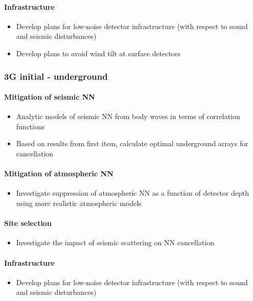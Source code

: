 \paragraph{Infrastructure}
\begin{itemize}
\item Develop plans for low-noise detector infrastructure (with respect to sound and seismic disturbances)
\item Develop plans to avoid wind tilt at surface detectors
\end{itemize}

\subsubsection{3G initial - underground}
\paragraph{Mitigation of seismic NN}
\begin{itemize}
\item Analytic models of seismic NN from body waves in terms of correlation functions
\item Based on results from first item, calculate optimal underground arrays for cancellation
\end{itemize}

\paragraph{Mitigation of atmospheric NN}
\begin{itemize}
\item Investigate suppression of atmospheric NN as a function of detector depth using more realistic atmospheric models
\end{itemize}

\paragraph{Site selection}
\begin{itemize}
\item Investigate the impact of seismic scattering on NN cancellation
\end{itemize}

\paragraph{Infrastructure}
\begin{itemize}
\item Develop plans for low-noise detector infrastructure (with respect to sound and seismic disturbances)
\end{itemize}

